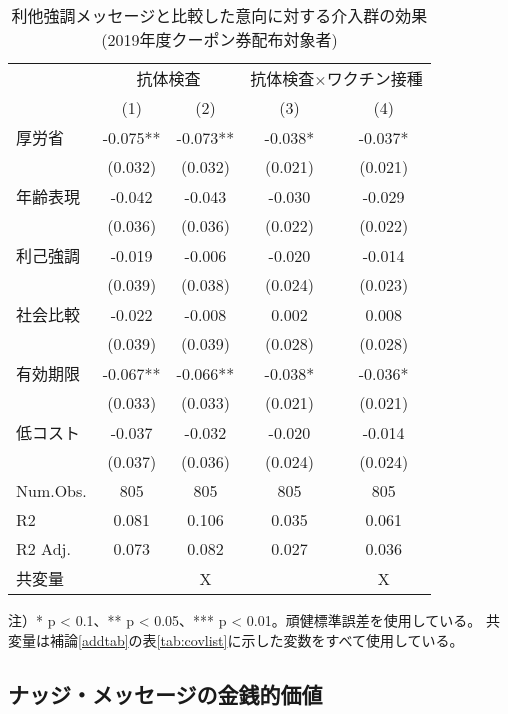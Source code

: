\documentclass[
  11pt,
  a4paper,
]{article}
\begin{document}
\begin{table}

\caption{\label{tab:show-act-coupon1-altreg}利他強調メッセージと比較した意向に対する介入群の効果 (2019年度クーポン券配布対象者)}
\centering
\begin{threeparttable}
\begin{tabular}[t]{lcccc}
\toprule
\multicolumn{1}{c}{ } & \multicolumn{2}{c}{抗体検査} & \multicolumn{2}{c}{抗体検査×ワクチン接種} \\
\cmidrule(l{3pt}r{3pt}){2-3} \cmidrule(l{3pt}r{3pt}){4-5}
  & (1) & (2) & (3) & (4)\\
\midrule
厚労省 & -0.075** & -0.073** & -0.038* & -0.037*\\
 & (0.032) & (0.032) & (0.021) & (0.021)\\
年齢表現 & -0.042 & -0.043 & -0.030 & -0.029\\
 & (0.036) & (0.036) & (0.022) & (0.022)\\
利己強調 & -0.019 & -0.006 & -0.020 & -0.014\\
 & (0.039) & (0.038) & (0.024) & (0.023)\\
社会比較 & -0.022 & -0.008 & 0.002 & 0.008\\
 & (0.039) & (0.039) & (0.028) & (0.028)\\
有効期限 & -0.067** & -0.066** & -0.038* & -0.036*\\
 & (0.033) & (0.033) & (0.021) & (0.021)\\
低コスト & -0.037 & -0.032 & -0.020 & -0.014\\
 & (0.037) & (0.036) & (0.024) & (0.024)\\
\midrule
Num.Obs. & 805 & 805 & 805 & 805\\
R2 & 0.081 & 0.106 & 0.035 & 0.061\\
R2 Adj. & 0.073 & 0.082 & 0.027 & 0.036\\
共変量 &  & X &  & X\\
\bottomrule
\end{tabular}
\begin{tablenotes}
\item 注）* p < 0.1、** p < 0.05、*** p < 0.01。頑健標準誤差を使用している。 共変量は補論\ref{addtab}の表\ref{tab:covlist}に示した変数をすべて使用している。
\end{tablenotes}
\end{threeparttable}
\end{table}

\hypertarget{econvalue}{%
\subsection{ナッジ・メッセージの金銭的価値}\label{econvalue}}
\end{document}
